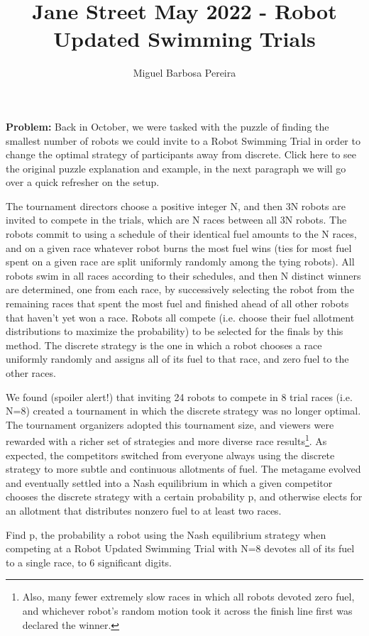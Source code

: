 \documentclass[]{article}
\title{Jane Street May 2022 - Robot Updated Swimming Trials}
\author{Miguel Barbosa Pereira}
\theoremstyle{plain}      %
\theoremstyle{definition} %
\begin{document}
\maketitle

\textbf{Problem:} Back in October, we were tasked with the puzzle of finding the smallest number of robots we could invite to a Robot Swimming Trial in order to change the optimal strategy of participants away from discrete. Click here to see the original puzzle explanation and example, in the next paragraph we will go over a quick refresher on the setup.

The tournament directors choose a positive integer N, and then 3N robots are invited to compete in the trials, which are N races between all 3N robots. The robots commit to using a schedule of their identical fuel amounts to the N races, and on a given race whatever robot burns the most fuel wins (ties for most fuel spent on a given race are split uniformly randomly among the tying robots). All robots swim in all races according to their schedules, and then N distinct winners are determined, one from each race, by successively selecting the robot from the remaining races that spent the most fuel and finished ahead of all other robots that haven't yet won a race. Robots all compete (i.e. choose their fuel allotment distributions to maximize the probability) to be selected for the finals by this method. The discrete strategy is the one in which a robot chooses a race uniformly randomly and assigns all of its fuel to that race, and zero fuel to the other races.

We found (spoiler alert!) that inviting 24 robots to compete in 8 trial races (i.e. N=8) created a tournament in which the discrete strategy was no longer optimal. The tournament organizers adopted this tournament size, and viewers were rewarded with a richer set of strategies and more diverse race results\footnote{Also, many fewer extremely slow races in which all robots devoted zero fuel, and whichever robot's random motion took it across the finish line first was declared the winner.}. As expected, the competitors switched from everyone always using the discrete strategy to more subtle and continuous allotments of fuel. The metagame evolved and eventually settled into a Nash equilibrium in which a given competitor chooses the discrete strategy with a certain probability p, and otherwise elects for an allotment that distributes nonzero fuel to at least two races.

Find p, the probability a robot using the Nash equilibrium strategy when competing at a Robot Updated Swimming Trial with N=8 devotes all of its fuel to a single race, to 6 significant digits.
\end{document}
